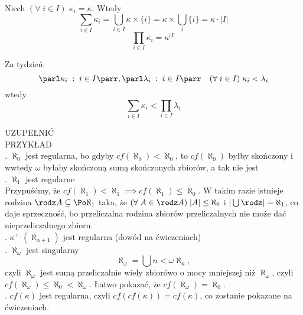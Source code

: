 Niech $(\forall\;i\in I)\;\kappa_i=\kappa$. Wtedy
$$\sum\limits_{i\in I}\kappa_i=\bigcup\limits_{i\in I}\kappa\times\{i\} = \kappa\times\bigcup\limits_i\{i\}=\kappa\cdot|I|$$
$$\prod\limits_{i\in I}\kappa_i=\kappa^{|I|}$$

Za tydzień:
$$\parl\kappa_i\;:\;i\in I\parr,\parl\lambda_i\;:\;i\in I\parr\quad (\forall\;i\in I)\;\kappa_i<\lambda_i$$
wtedy
$$\sum\limits_{i\in I}\kappa_i<\prod\limits_{i\in I}\lambda_i$$

{\large\color{cyan}UZUPEŁNIĆ}\bigskip\\
{\large\color{acc}PRZYKŁAD}\medskip\\
. $\aleph_0$ jest regularna, bo gdyby $cf(\aleph_0)<\aleph_0$, to $cf(\aleph_0)$ byłby skończony i wwtedy $\omega$ byłaby skończoną sumą skończonych zbiorów, a tak nie jest\medskip\\
. $\aleph_1$ jest regularne\smallskip\\
Przypuśćmy, że $cf(\aleph_1)<\aleph_1\implies cf(\aleph_1)\leq \aleph_0$. W takim razie istnieje rodzina $\rodz A\subseteq \Po\aleph_1$ taka, że $(\forall\; A\in\rodz A)\;|A|\leq\aleph_0$ i $|\bigcup\rodz|=\aleph_1$, co daje sprzeczność, bo przeliczalna rodzina zbiorów przeliczalnych nie może dać nieprzeliczalnego zbioru.\medskip\\
. $\kappa^+\;(\aleph_{\alpha+1})$ jest regularna (dowód na ćwiczeniach)\medskip\\
. $\aleph_\omega$ jest singularny\smallskip\\
$$\aleph_\omega=\bigcup\limits{n<\omega}\aleph_n,$$
czyli $\aleph_\omega$ jest sumą przeliczalnie wiely zbiorówo o mocy mniejszej niż $\aleph_\omega$, czyli $cf(\aleph_\omega)\leq\aleph_0<\aleph_\omega$. Łatwo pokazać, że $cf(\aleph_\omega)=\aleph_0$.\medskip\\
. $cf(\kappa)$ jest regularna, czyli $cf(cf(\kappa))=cf(\kappa)$, co zostanie pokazane na ćwiczeniach.

